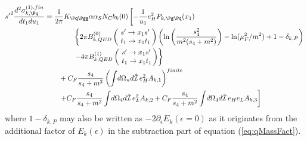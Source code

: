 \begin{align}
{s'}^2\frac{d^2\sigma_{k,\Pq}^{(1),fin}}{dt_1du_1} &=\frac{1}{2\pi}K_{\Pq\Pgg}\alpha\alpha_SN_Cb_k(0)\left[-\frac 1 {u_1}e_H^2P_{k,\Pg\Pq}(x_1)\right. \nonumber\\
 &\hspace{40pt}\left\{2\pi B^{(0)}_{k,QED}\left(\!\begin{array}{l}s'\rightarrow x_1s'\\t_1\rightarrow x_1 t_1\end{array}\!\!\right) \left(\ln\left(\frac{s_4^2}{m^2(s_4+m^2)}\right)-\ln(\mu_F^2/m^2)+1-\delta_{k,P}\right)\right. \nonumber\\
 &\hspace{40pt}\left.-4\pi B^{(1)}_{k,QED}\left(\!\begin{array}{l}s'\rightarrow x_1s'\\t_1\rightarrow x_1 t_1\end{array}\!\!\right)\right\} \nonumber\\
 &\hspace{20pt}+C_F\frac{s_4}{s_4+m^2}\left(\int\!d\Omega_nd\hat{\mathcal I}\,e_H^2A_{k,1}\right)^{finite} \nonumber\\
 &\hspace{20pt}\left.+C_F\frac{s_4}{s_4+m^2}\int\!d\Omega_4d\hat{\mathcal I}\,e_L^2A_{k,2} +C_F\frac{s_4}{s_4+m^2}\int\!d\Omega_4d\hat{\mathcal I}\,e_H e_L A_{k,3} \right]
\end{align}
where $1-\delta_{k,P}$ may also be written as $-2\partial_\epsilon E_{k}(\epsilon=0)$ as it originates from the additional factor of $E_k(\epsilon)$ in the subtraction part of equation (\ref{eq:qMassFact}).
